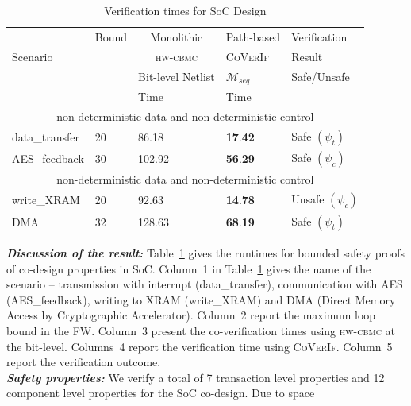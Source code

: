 \documentclass[sigconf]{acmart}
\newcommand{\tool}[1]{\textsc{#1}\xspace}
\newcommand{\hwcbmcv}{\tool{hw-cbmc}}
\newcommand{\verifox}{\tool{CoVerIf}}
\begin{document}
\begin{table}
\begin{center}
{
\begin{scriptsize}
\begin{tabular}{|l|l|l|l|l|}
\hline
  & Bound & \multicolumn{1}{c|}{Monolithic} & \multicolumn{1}{c|}{Path-based} &
  Verification \\ 
\cline{3-4}
  Scenario &  & \multicolumn{1}{c|}{\hwcbmcv} & \verifox & Result \\ 
\cline{3-5}
      &       & Bit-level Netlist & $\mathcal{M}_{seq}$ & Safe/Unsafe \\
\cline{1-5}
      &       &   Time      & Time &  \\
\cline{1-5}      
\multicolumn{5}{|c|}{non-deterministic data and non-deterministic control} \\ \hline
  data\_transfer & 20 & 86.18 & \textbf{17}.\textbf{42} & Safe $(\psi_{t})$ \\
  \hline
  AES\_feedback & 30 & 102.92 & \textbf{56}.\textbf{29} & Safe $(\psi_{c})$ \\ 
\hline
\multicolumn{5}{|c|}{non-deterministic data and non-deterministic control} \\ \hline
  write\_XRAM & 20 & 92.63 & \textbf{14}.\textbf{78} & Unsafe $(\psi_{c})$ \\ 
\hline
  DMA & 32 & 128.63 & \textbf{68}.\textbf{19} & Safe $(\psi_{t})$ \\ 
\hline
\end{tabular}
\end{scriptsize}
}
\end{center}
\caption{Verification times for SoC Design
\label{table:SoC}}
\end{table}
%
\textbf{\emph{Discussion of the result:}}
%
Table~\ref{table:SoC} gives the runtimes for bounded safety proofs of 
co-design properties in SoC.  Column~1 in
Table~\ref{table:SoC} gives the name of the scenario -- transmission with
interrupt (data\_transfer), communication with AES (AES\_feedback), writing to 
XRAM (write\_XRAM) and DMA (Direct Memory Access by Cryptographic Accelerator).  
Column~2 report the maximum loop bound in the FW.  Column~3 present the 
co-verification times using \hwcbmcv at the bit-level.  Columns~4 report 
the verification time using \verifox. Column~5 report the verification outcome. \\
\textbf{\emph{Safety properties:}}
%
We verify a total of 7 transaction level properties and 12 
component level properties for the SoC co-design.  Due to space 
\end{document}
